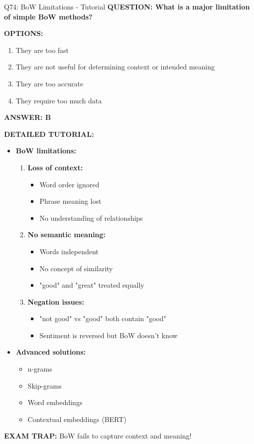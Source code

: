 \documentclass[8pt]{beamer}
\begin{document}
	\begin{frame}{Q74: BoW Limitations - Tutorial}
		\fontsize{6.5}{7.5}\selectfont
		\textbf{QUESTION: What is a major limitation of simple BoW methods?}
		
		\vspace{0.1cm}
		\textbf{OPTIONS:}
		\begin{enumerate}
			\item They are too fast
			\item They are not useful for determining context or intended meaning
			\item They are too accurate
			\item They require too much data
		\end{enumerate}
		
		\vspace{0.1cm}
		\textcolor{myblue}{\textbf{ANSWER: B}}
		
		\vspace{0.1cm}
		\textbf{DETAILED TUTORIAL:}
		\begin{itemize}
			\item \textbf{BoW limitations:}
			\begin{enumerate}
				\item \textbf{Loss of context:}
				\begin{itemize}
					\item Word order ignored
					\item Phrase meaning lost
					\item No understanding of relationships
				\end{itemize}
				\item \textbf{No semantic meaning:}
				\begin{itemize}
					\item Words independent
					\item No concept of similarity
					\item "good" and "great" treated equally
				\end{itemize}
				\item \textbf{Negation issues:}
				\begin{itemize}
					\item "not good" vs "good" both contain "good"
					\item Sentiment is reversed but BoW doesn't know
				\end{itemize}
			\end{enumerate}
			\item \textbf{Advanced solutions:}
			\begin{itemize}
				\item n-grams
				\item Skip-grams
				\item Word embeddings
				\item Contextual embeddings (BERT)
			\end{itemize}
		\end{itemize}
		
		\textcolor{myred}{\textbf{EXAM TRAP:}} BoW fails to capture \textcolor{myblue}{context and meaning}!
	\end{frame}
	
\end{document}

